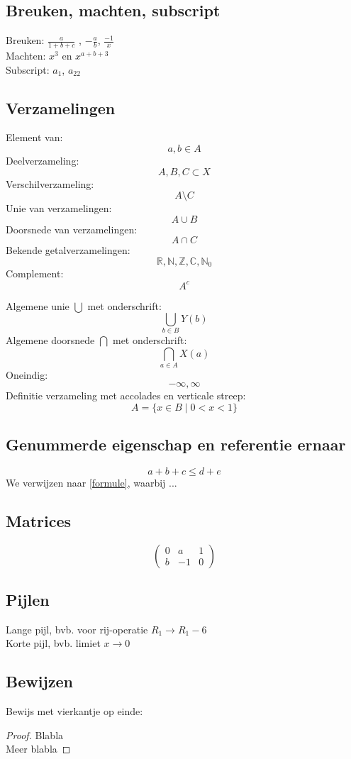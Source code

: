 \documentclass[a4paper]{article}
\begin{document}
\subsection*{Breuken, machten, subscript}
Breuken: $\frac{a}{1+b+c}$ , $-\frac{a}{b}$, $\frac{-1}{x}$ \\
Machten: $x^3$ en $x^{a+b+3}$ \\
Subscript: $a_1$, $a_{22}$

\subsection*{Verzamelingen}
Element van: \[a, b \in A\]
Deelverzameling: \[A,B,C \subset X\] 
Verschilverzameling: \[A \setminus C\] 
Unie van verzamelingen: \[A \cup B\] 
Doorsnede van verzamelingen: \[A \cap C\] 
Bekende getalverzamelingen: \[\mathbb{R}, \mathbb{N}, \mathbb{Z}, \mathbb{C}, \mathbb{N}_0 \] 
Complement: \[ A^c \]


Algemene unie $\bigcup$ met onderschrift: 
\[ \bigcup_{b \in B} Y(b) \] 
Algemene doorsnede $\bigcap$ met onderschrift:  
\[ \bigcap_{a \in A} X(a) \] 
Oneindig: 
\[ -\infty , \infty   \]
Definitie verzameling met accolades en verticale streep: 
\[ A = \{x \in B \mid 0<x<1\} \]

\subsection*{Genummerde eigenschap en referentie ernaar}
\begin{equation}\label{formule}
a + b + c \leq d + e 
\end{equation}
We verwijzen naar \ref{formule}, waarbij ...

\subsection*{Matrices}
\[ \begin{pmatrix}
0 & a & 1\\
b & -1 & 0
\end{pmatrix}\]


\subsection*{Pijlen}
Lange pijl, bvb. voor rij-operatie $R_1 \longrightarrow R_1 - 6$ \\
Korte pijl, bvb. limiet $x \rightarrow 0$ 

\subsection*{Bewijzen}
Bewijs met vierkantje op einde: 
\begin{proof}
Blabla \\
Meer blabla
\end{proof}
\end{document}
